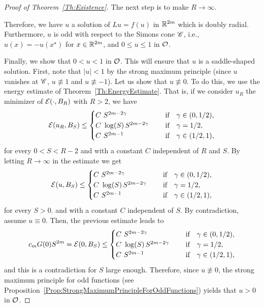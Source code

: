 \begin{proof}[Proof of Theorem~\ref{Th:Existence}]
The next step is to make $R\to \infty$.


Therefore, we have $u$ a solution of $Lu = f(u)$ in $\mathbb{R}^{2m}$ which is doubly radial. Furthermore, $u$ is odd with respect to the Simons cone $\mathscr{C}$, i.e., $u(x) = -u(x^\star)$ for $x\in \mathbb{R}^{2m}$, and $0 \leq u\leq 1$ in $\mathcal{O}$.

Finally, we show that $0<u<1$ in $\mathcal{O}$. This will ensure that $u$ is a saddle-shaped solution. First, note that $|u| < 1$ by the strong maximum principle (since $u$ vanishes at $\mathscr{C}$, $u \not \equiv 1$  and $u\not\equiv -1$). Let us show that $u\not\equiv 0$. To do this, we use the energy estimate of Theorem~\ref{Th:EnergyEstimate}. That is, if we consider $u_R$ the minimizer of $\mathcal{E}(\cdot, B_R)$ with $R > 2$, we have
$$
\mathcal{E} (u_R,B_S) \leq \begin{cases}
C \ S^{2m-2\gamma}\ \ \ \ &\textrm{if } \ \ \gamma\in(0,1/2),\\
C\ \log(S)\,S^{2m-2\gamma}\ \ \ \ &\textrm{if } \ \ \gamma=1/2,\\
C \ S^{2m-1}\ \ \ \ &\textrm{if } \ \ \gamma\in(1/2,1),\\
\end{cases} $$
for every $0 < S < R-2$ and with a constant $C$ independent of $R$ and $S$. By letting $R \to \infty$ in the estimate we get
$$
\mathcal{E} (u,B_S) \leq \begin{cases}
C \ S^{2m-2\gamma}\ \ \ \ &\textrm{if } \ \ \gamma\in(0,1/2),\\
C\ \log(S)\,S^{2m-2\gamma}\ \ \ \ &\textrm{if } \ \ \gamma=1/2,\\
C \ S^{2m-1}\ \ \ \ &\textrm{if } \ \ \gamma\in(1/2,1),\\
\end{cases} $$
for every $S > 0$. and with a constant $C$ independent of $S$. By contradiction, assume $u\equiv 0$. Then, the previous estimate leads to
$$
c_m G(0)S^{2m} = \mathcal{E}(0, B_S) \leq \begin{cases}
C \ S^{2m-2\gamma}\ \ \ \ &\textrm{if } \ \ \gamma\in(0,1/2),\\
C\ \log(S)\,S^{2m-2\gamma}\ \ \ \ &\textrm{if } \ \ \gamma=1/2,\\
C \ S^{2m-1}\ \ \ \ &\textrm{if } \ \ \gamma\in(1/2,1),\\
\end{cases} $$
and this is a contradiction for $S$ large enough. Therefore, since $u \not \equiv 0$, the strong maximum principle for odd functions (see Proposition~\ref{Prop:StrongMaximumPrincipleForOddFunctions}) yields that $u>0$ in $\mathcal{O}$. 
\end{proof}

